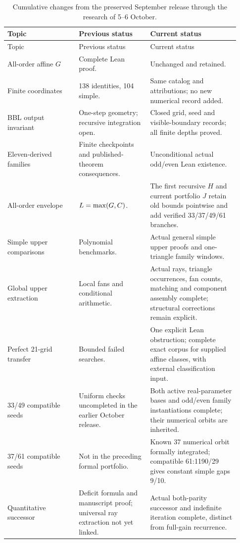 \begin{longtable}{@{}P{0.29\linewidth}P{0.29\linewidth}P{0.35\linewidth}@{}}
\caption{Cumulative changes from the preserved September release through
the research of 5--6 October.}
\label{app:release-table}\\
\toprule Topic & Previous status & Current status\\\midrule\endfirsthead
\toprule Topic & Previous status & Current status\\\midrule\endhead
\bottomrule\endfoot
All-order affine $G$ & Complete Lean proof. & Unchanged and retained.\\
Finite coordinates & 138 identities, 104 simple. & Same catalog and
attributions; no new numerical record added.\\
BBL output invariant & One-step geometry; recursive integration open. &
Closed grid, seed and visible-boundary records; all finite depths proved.\\
Eleven-derived families & Finite checkpoints and published-theorem
consequences. & Unconditional actual odd/even Lean existence.\\
All-order envelope & $L=\max(G,C)$. & The first recursive $H$
and current portfolio $J$ retain old bounds pointwise and add verified
33/37/49/61 branches.\\
Simple upper comparisons & Polynomial benchmarks. & Actual general
simple upper proofs and one-triangle family windows.\\
Global upper extraction & Local fans and conditional arithmetic. &
Actual rays, triangle occurrences, fan counts, matching and component
assembly complete; structural corrections remain explicit.\\
Perfect 21-grid transfer & Bounded failed searches. & One explicit
Lean obstruction; complete exact corpus for supplied affine classes,
with external classification input.\\
33/49 compatible seeds & Uniform checks uncompleted in the earlier
October release. & Both active real-parameter bases and odd/even family
instantiations complete; their numerical orbits are inherited.\\
37/61 compatible seeds & Not in the preceding formal portfolio. & Known
37 numerical orbit formally integrated; compatible 61:1190/29 gives
constant simple gaps 9/10.\\
Quantitative successor & Deficit formula and manuscript proof;
universal ray extraction not yet linked. & Actual both-parity successor
and indefinite iteration complete, distinct from full-gain recurrence.\\

\end{longtable}
